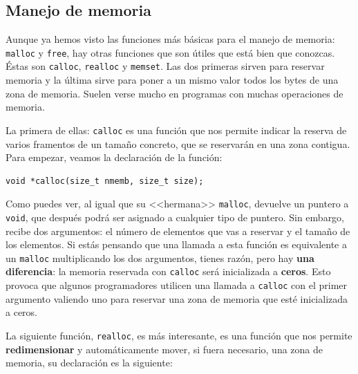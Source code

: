 \documentclass[a4paper]{article}
\begin{document}
\subsection{Manejo de memoria}
Aunque ya hemos visto las funciones más básicas para el manejo de memoria:
\verb!malloc! y \verb!free!, hay otras funciones que son útiles que está bien
que conozcas. Éstas son \verb!calloc!, \verb!realloc! y \verb!memset!. Las dos
primeras sirven para reservar memoria y la última sirve para poner a un mismo
valor todos los bytes de una zona de memoria. Suelen verse mucho en programas
con muchas operaciones de memoria.

La primera de ellas: \verb!calloc! es una función que nos permite indicar la
reserva de varios framentos de un tamaño concreto, que se reservarán en una
zona contigua. Para empezar, veamos la declaración de la función:

\noindent
\begin{minipage}[H]{\linewidth}
\mbox{}
\begin{lstlisting}[style=C,
caption={Declaración de la función \texttt{calloc}},
label={lst:callocSignature}]
void *calloc(size_t nmemb, size_t size);
\end{lstlisting}
\end{minipage}
Como puedes ver, al igual que su <<hermana>> \verb!malloc!, devuelve un
puntero a \verb!void!, que después podrá ser asignado a cualquier tipo de
puntero. Sin embargo, recibe dos argumentos: el número de elementos que vas
a reservar y el tamaño de los elementos. Si estás pensando que una llamada a
esta función es equivalente a un \verb!malloc! multiplicando los dos argumentos,
tienes razón, pero hay \textbf{una diferencia}: la memoria reservada con
\verb!calloc! será inicializada a \textbf{ceros}. Esto provoca que algunos
programadores utilicen una llamada a \verb!calloc! con el primer argumento
valiendo uno para reservar una zona de memoria que esté inicializada a ceros.

La siguiente función, \verb!realloc!, es más interesante, es una función que nos
permite \textbf{redimensionar} y automáticamente mover, si fuera necesario,
una zona de memoria, su declaración es la siguiente:
\end{document}
